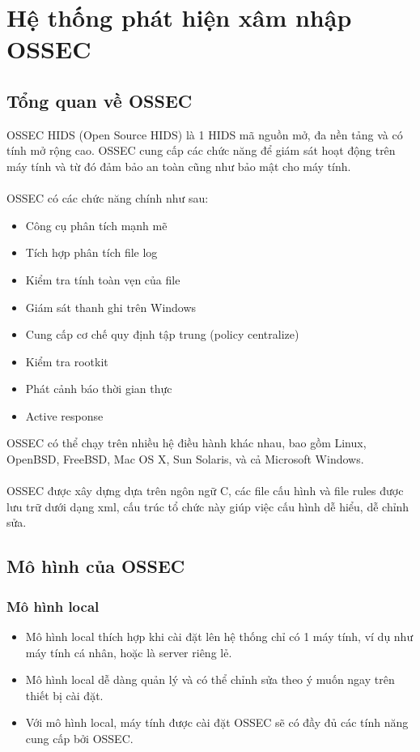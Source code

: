 \chapter{Hệ thống phát hiện xâm nhập OSSEC}
\section{Tổng quan về OSSEC}
  OSSEC HIDS (Open Source HIDS) là 1 HIDS mã nguồn mở, đa nền tảng và có tính mở rộng cao.
OSSEC cung cấp các chức năng để giám sát hoạt động trên máy tính và từ đó đảm
bảo an toàn cũng như bảo mật cho máy tính.\\\\
  OSSEC có các chức năng chính như sau:
  \begin{itemize}
    \item Công cụ phân tích mạnh mẽ
    \item Tích hợp phân tích file log
    \item Kiểm tra tính toàn vẹn của file
    \item Giám sát thanh ghi trên Windows
    \item Cung cấp cơ chế quy định tập trung (policy centralize)
    \item Kiểm tra rootkit
    \item Phát cảnh báo thời gian thực
    \item Active response
  \end{itemize}
  OSSEC có thể chạy trên nhiều hệ điều hành khác nhau, bao gồm Linux, OpenBSD,
  FreeBSD, Mac OS X, Sun Solaris, và cả Microsoft Windows.\\\\
OSSEC được xây dựng dựa trên ngôn ngữ C, các file cấu hình và file rules được
lưu trữ dưới dạng xml, cấu trúc tổ chức này giúp việc cấu hình dễ hiểu, dễ chỉnh
sửa.
\section{Mô hình của OSSEC}
  \subsection{Mô hình local}
    \begin{itemize}
      \item Mô hình local thích hợp khi cài đặt lên hệ thống chỉ có 1 máy tính, ví dụ
    như máy tính cá nhân, hoặc là server riêng lẻ.
    \item Mô hình local dễ dàng quản lý và có thể chỉnh sửa theo ý muốn ngay trên thiết
bị cài đặt.
	\item Với mô hình local, máy tính được cài đặt OSSEC sẽ có đầy đủ các tính năng
cung cấp bởi OSSEC.
    \end{itemize}
    
